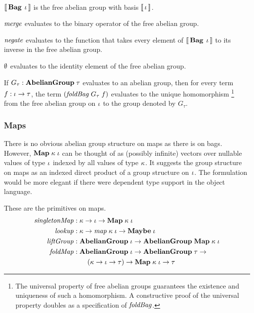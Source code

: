 \begin{oldSec}
\begin{definition}~
\begin{subdefinition}
\item $\Eval{\Bag[\Gi]}$ is the free abelian group with basis $\Eval\Gi$.
\item $\mathit{merge}$ evaluates to the binary operator of the free abelian
group.
\item $\mathit{negate}$ evaluates to the function that takes every
element of $\Eval{\Bag[\Gi]}$ to its inverse in the free abelian
group.
\item $\Empty$ evaluates to the identity element of the free
abelian group.
\item\label{foldBag-homomorphism} If
$\HasType{G_\tau}{\Abelian\tau}$ evaluates to an abelian group,
then for every term $\HasType f {\Fun\Gi\Gt}$, the term
$\App*{\App\FOLDBAG{G_\tau}}{f}$ evaluates to the unique
homomorphism%
\footnote{ The universal property of free abelian groups
guarantees the existence and uniqueness of such a homomorphism. A
constructive proof of the universal property doubles as a
specification of $\mathit{foldBag}$. } %
from the free abelian group on $\iota$ to the group denoted by
$G_\tau$.
\end{subdefinition}
\end{definition}

\subsubsection{Maps}

There is no obvious abelian group structure on maps as there is
on bags. However, $\HashMap\Gk\Gi$ can be thought of as (possibly
infinite) vectors over nullable values of type $\iota$ indexed by
all values of type $\kappa$. It suggests the group structure on maps
as an indexed direct product of a group structure on $\iota$. The
formulation would be more elegant if there were dependent type
support in the object language.

These are the primitives on maps.
\begin{align*}
\HasTypeAligned\MAKEMAP
  {\Fun\Gk{\Fun\Gi{\HashMap\Gk\Gi}}}
\\
\HasTypeAligned\LOOKUP
  {\Fun\Gk{\Fun{\Map\Gk\Gi}{\Maybe\Gi}}}
\\
\HasTypeAligned\LIFTGROUP
  \Fun{\Abelian\Gi}{\Abelian{\HashMap\Gk\Gi}}
\\
\HasTypeAligned\FOLDMAP
  \Fun{\Abelian\Gi}
    {\Fun{\Abelian\Gt} \\ & \qquad
      {\Fun{ \Fun*\Gk{\Fun\Gi\Gt} }
        {\Fun{\HashMap\Gk\Gi} \Gt}}}
\end{align*}


\end{oldSec}
